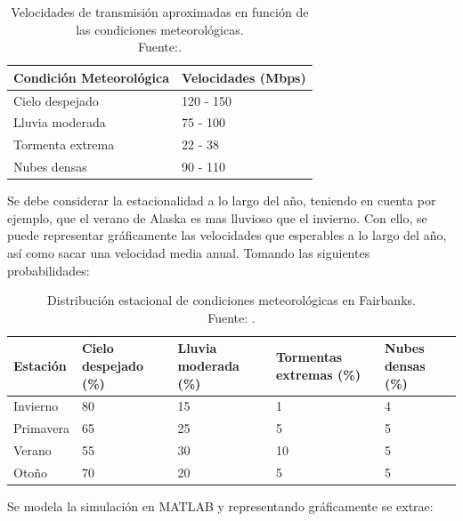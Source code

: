 \begin{table}[H]
\centering
\caption{Velocidades de transmisión aproximadas en función de las condiciones meteorológicas. \\ Fuente:\cite{rain_attenuation_xband_2012}.}
\begin{tabular}{ll}
\hline
\textbf{Condición Meteorológica} & \textbf{Velocidades (Mbps)} \\
\hline
Cielo despejado & 120 - 150 \\
Lluvia moderada & 75 - 100 \\
Tormenta extrema & 22 - 38 \\
Nubes densas & 90 - 110 \\
\hline
\end{tabular}

\end{table}

Se debe considerar la estacionalidad a lo largo del año, teniendo en cuenta por ejemplo, que el verano de Alaska es mas lluvioso que el invierno. Con ello, se puede representar gráficamente las velocidades que  esperables a lo largo del año, así como sacar una velocidad media anual. Tomando las siguientes probabilidades:

\begin{table}[H]
\caption{Distribución estacional de condiciones meteorológicas en Fairbanks. \\Fuente: \cite{climate_data_fairbanks}.}
\centering
\begin{tabularx}{\textwidth}{X X X X X}
\toprule
\textbf{Estación} & \textbf{Cielo despejado (\%)} & \textbf{Lluvia moderada (\%)} & \textbf{Tormentas extremas (\%)} & \textbf{Nubes densas (\%)} \\
\midrule
Invierno  & 80 & 15 & 1  & 4  \\
Primavera & 65 & 25 & 5  & 5  \\
Verano    & 55 & 30 & 10 & 5  \\
Otoño     & 70 & 20 & 5  & 5  \\
\bottomrule
\end{tabularx}

\end{table}

Se modela la simulación en MATLAB y representando gráficamente se extrae:

